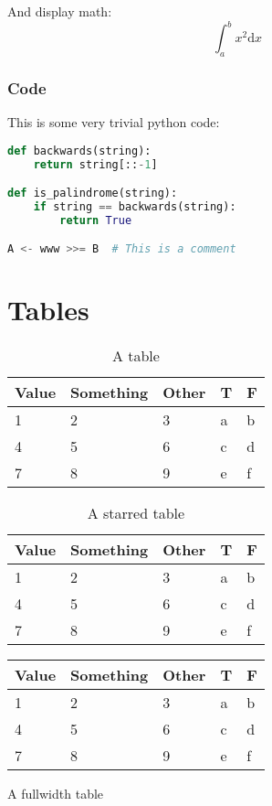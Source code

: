 \documentclass{jcls}
\begin{document}
And display math:
\[
	\int_a^b x^2  \mathrm{d} x
\]

\subsubsection{Code}

This is some very trivial python code:

\begin{lstlisting}[language=Python]
def backwards(string):
    return string[::-1]

def is_palindrome(string):
    if string == backwards(string): 
		return True

A <- www >>= B  # This is a comment
\end{lstlisting}

\section{Tables}

\begin{table}[ht]
	\begin{tabular}{@{}lllll@{}}
		Value & Something & Other & T & F \\ \midrule
		1     & 2         & 3     & a & b \\
		4     & 5         & 6     & c & d \\
		7     & 8         & 9     & e & f \\
	\end{tabular}
	\caption{A table}
\end{table}


\begin{table*}
	\begin{tabular}{@{}lllll@{}}
		Value & Something & Other & T & F \\ \midrule
		1     & 2         & 3     & a & b \\
		4     & 5         & 6     & c & d \\
		7     & 8         & 9     & e & f \\
	\end{tabular}
	\caption{A starred table}
\end{table*}

\begin{fullwidthtable}
	\begin{tabular}{@{}lllll@{}}
		Value & Something & Other & T & F \\ \midrule
		1     & 2         & 3     & a & b \\
		4     & 5         & 6     & c & d \\
		7     & 8         & 9     & e & f \\
	\end{tabular}
	\caption{A fullwidth table}
\end{fullwidthtable}
\end{document}
